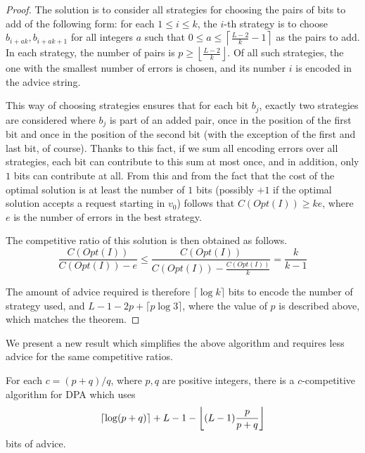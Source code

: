 \begin{proof}
    The solution is to consider all strategies for choosing the pairs of
    bits to add of the following form: for each $1 \leq i \leq k$, the
    $i$-th strategy is to choose $b_{i+ak}, b_{i+ak+1}$ for all integers
    $a$ such that $0 \leq a \leq \left\lceil\frac{L-2}{k}-1\right\rceil$
    as the pairs to add. In each strategy, the number of pairs is $p \geq
    \left\lfloor\frac{L-2}{k}\right\rfloor$. Of all such strategies, the
    one with the smallest number of errors is chosen, and its number $i$
    is encoded in the advice string.

    This way of choosing strategies ensures that for each bit $b_j$,
    exactly two strategies are considered where $b_j$ is part of an added
    pair, once in the position of the first bit and once in the position
    of the second bit (with the exception of the first and last bit, of
    course). Thanks to this fact, if we sum all encoding errors over all
    strategies, each bit can contribute to this sum at most once, and in
    addition, only $1$ bits can contribute at all. From this and from the
    fact that the cost of the optimal solution is at least the number of
    $1$ bits (possibly $+1$ if the optimal solution accepts a request
    starting in $v_0$) follows that $C(Opt(I)) \geq ke$, where $e$ is the
    number of errors in the best strategy.

    The competitive ratio of this solution is then obtained as follows.
    $$
        \frac{C(Opt(I))}{C(Opt(I)) - e} \leq \frac{C(Opt(I))}{C(Opt(I)) -
        \frac{C(Opt(I))}{k}} = \frac{k}{k-1}
    $$

    The amount of advice required is therefore $\lceil\log{}k\rceil$ bits
    to encode the number of strategy used, and $L - 1 - 2p +
    \lceil{}p\log{}3\rceil$, where the value of $p$ is described above,
    which matches the theorem.
\end{proof}

We present a new result which simplifies the above algorithm and requires
less advice for the same competitive ratios.

\begin{theorem}\label{theorem:dpa-fraction}
    For each $c = (p+q)/q$, where $p, q$ are positive integers, there is a
    $c$-competitive algorithm for DPA which uses
    $$\ceil*{\log(p+q)} + L - 1 - \floor*{(L-1) \frac{p}{p + q}}$$
    bits of advice.
\end{theorem}

